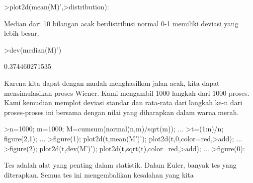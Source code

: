 \documentclass[a4paper,10pt]{article}
\begin{document}
\begin{eulernotebook}
\begin{eulercomment}
\begin{eulercomment}
\begin{eulercomment}
\begin{eulercomment}
\begin{eulercomment}
\begin{eulercomment}
\begin{eulercomment}
\begin{eulercomment}
\begin{eulercomment}
\begin{eulercomment}
\begin{eulercomment}
\begin{eulercomment}
\begin{eulercomment}
\begin{eulercomment}
\begin{eulercomment}
\begin{eulercomment}
\begin{eulercomment}
\begin{eulercomment}
\begin{eulercomment}
\begin{eulercomment}
\begin{eulercomment}
\begin{eulercomment}
\begin{eulercomment}
\begin{eulercomment}
\begin{eulercomment}
\begin{eulercomment}
\begin{eulercomment}
\begin{eulercomment}
\begin{eulercomment}
\begin{eulercomment}
\begin{eulercomment}
\begin{eulercomment}
\begin{eulercomment}
\begin{eulercomment}
\begin{eulercomment}
\begin{eulercomment}
\begin{eulercomment}
\begin{eulercomment}
\begin{eulercomment}
\begin{eulercomment}
\begin{eulercomment}
\begin{eulercomment}
\begin{eulercomment}
\begin{eulercomment}
\begin{eulerprompt}
>plot2d(mean(M)',>distribution):
\end{eulerprompt}
\begin{eulercomment}
Median dari 10 bilangan acak berdistribusi normal 0-1 memiliki deviasi
yang lebih besar.
\end{eulercomment}
\begin{eulerprompt}
>dev(median(M)')
\end{eulerprompt}
\begin{euleroutput}
  0.374460271535
\end{euleroutput}
\begin{eulercomment}
Karena kita dapat dengan mudah menghasilkan jalan acak, kita dapat
mensimulasikan proses Wiener. Kami mengambil 1000 langkah dari 1000
proses. Kami kemudian memplot deviasi standar dan rata-rata dari
langkah ke-n dari proses-proses ini bersama dengan nilai yang
diharapkan dalam warna merah.
\end{eulercomment}
\begin{eulerprompt}
>n=1000; m=1000; M=cumsum(normal(n,m)/sqrt(m)); ...
>t=(1:n)/n; figure(2,1); ...
>figure(1); plot2d(t,mean(M')'); plot2d(t,0,color=red,>add); ...
>figure(2); plot2d(t,dev(M')'); plot2d(t,sqrt(t),color=red,>add); ...
>figure(0):
\end{eulerprompt}
\begin{eulercomment}
Tes adalah alat yang penting dalam statistik. Dalam Euler, banyak tes
yang diterapkan. Semua tes ini mengembalikan kesalahan yang kita

\end{eulercomment}
\end{eulercomment}
\end{eulercomment}
\end{eulercomment}
\end{eulercomment}
\end{eulercomment}
\end{eulercomment}
\end{eulercomment}
\end{eulercomment}
\end{eulercomment}
\end{eulercomment}
\end{eulercomment}
\end{eulercomment}
\end{eulercomment}
\end{eulercomment}
\end{eulercomment}
\end{eulercomment}
\end{eulercomment}
\end{eulercomment}
\end{eulercomment}
\end{eulercomment}
\end{eulercomment}
\end{eulercomment}
\end{eulercomment}
\end{eulercomment}
\end{eulercomment}
\end{eulercomment}
\end{eulercomment}
\end{eulercomment}
\end{eulercomment}
\end{eulercomment}
\end{eulercomment}
\end{eulercomment}
\end{eulercomment}
\end{eulercomment}
\end{eulercomment}
\end{eulercomment}
\end{eulercomment}
\end{eulercomment}
\end{eulercomment}
\end{eulercomment}
\end{eulercomment}
\end{eulercomment}
\end{eulercomment}
\end{eulercomment}
\end{eulernotebook}
\end{document}
